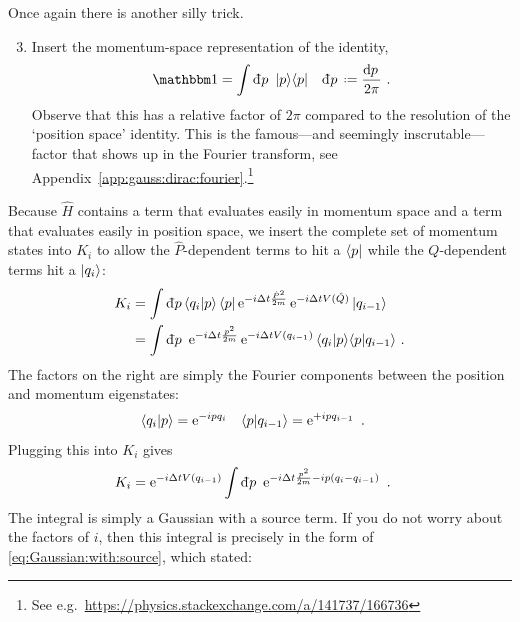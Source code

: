 \documentclass[12pt, oneside]{report}    %
\begin{document}
Once again there is another silly trick. 
\begin{enumerate}
    \setcounter{enumi}{2}
    \item Insert the momentum-space representation of the identity,
    \begin{align}
        \one &= \int \Dbar{p}\, \ket{p}\!\bra{p} 
        &
        \Dbar{p}\defeq \frac{\D{p}}{2\pi} \ .
    \end{align}
    Observe that this has a relative factor of $2\pi$ compared to the resolution of the `position space' identity. This is the famous---and seemingly inscrutable---factor that shows up in the Fourier transform, see Appendix~\ref{app:gauss:dirac:fourier}.\footnote{See e.g.\ \url{https://physics.stackexchange.com/a/141737/166736}} 
\end{enumerate}
Because $\hat H$ contains a term that evaluates easily in momentum space and a term that evaluates easily in position space, we insert the complete set of momentum states into $K_i$ to allow the $\hat P$-dependent terms to hit a $\left\langle p\right|$ while the $Q$-dependent terms hit a $\left|q_i\right\rangle$:
\begin{align}
    K_i &=
    \int \Dbar{p} \la {q_{i}} | p \ra \bra{p} \e^{-i\Delta t\frac{ \hat P^2}{2m}} \e^{-i\Delta tV(\hat Q)} \ket{q_{i-1}}
    \label{eq:path:integral:Ki:operator}
    \\ &=
    \int \Dbar{p} \, \e^{-i\Delta t\frac{ p^2}{2m}} \e^{-i\Delta tV(q_{i-1})}\,  \la {q_{i}} | p \ra \la p | q_{i-1} \ra  \ .
    \label{eq:path:integral:Ki:eigen}
\end{align}
The factors on the right are simply the Fourier components between the position and momentum eigenstates:
\begin{align}
    \langle {q_{i}} | p \rangle &= \operatorname{e}^{-ipq_i}
    &
    \langle p | q_{i-1} \rangle &= \operatorname{e}^{+ipq_{i-1}}
    \ .
\end{align}
Plugging this into $K_i$ gives
\begin{align}
    K_i &=
    \e^{-i\Delta tV(q_{i-1})} \int \Dbar{p} \, \e^{-i\Delta t\frac{ p^2}{2m} - i p(q_i - q_{i-1}) } \ .
\end{align}
The integral is simply a Gaussian with a source term. If you do not worry about the factors of $i$, then this integral is precisely in the form of \eqref{eq:Gaussian:with:source}, which stated:
\end{document}
